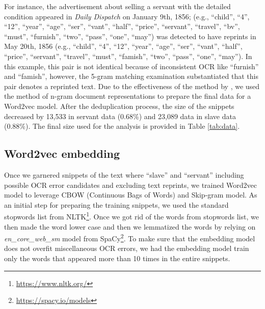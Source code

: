 \documentclass[11pt]{article}
\begin{document}
For instance, the advertisement about selling a servant with the detailed condition appeared in \textit{Daily Dispatch} on January 9th, 1856; 
(e.g., ``child'', ``4'', ``12'', ``year'', ``age'', ``ser'', ``vant'', ``half'', ``price'', ``servant'', ``travel'', ``bv'', ``must'', ``furnish'', ``two'', ``pass'', ``one'', ``may'') 
was detected to have reprints in May 20th, 1856 
(e.g., ``child'', ``4'', ``12'', ``year'', ``age'', ``ser'', ``vant'', ``half'', ``price'', ``servant'', ``travel'', ``must'', ``famish'', ``two'', ``pass'', ``one'', ``may''). 
In this example, this pair is not identical because of inconsistent OCR like ``furnish'' and ``famish'', however, the 5-gram matching examination substantiated that this pair denotes a reprinted text. 
Due to the effectiveness of the method by \citet{smith_detecting_2014}, we used the method of n-gram document representations to prepare the final data for a Word2vec model. 
After the deduplication process, the size of the snippets decreased by 13,533 in servant data (0.68\%) and 23,089 data in slave data (0.88\%). 
The final size used for the analysis is provided in Table \ref{tab:data}.

\subsection{Word2vec embedding} \label{word2vec embedding}
Once we garnered snippets of the text where ``slave'' and ``servant'' including possible OCR error candidates and excluding text reprints, we trained Word2vec model \citep{mikolov_distributed_2013} to leverage CBOW (Continuous Bags of Words) and Skip-gram model.
As an initial step for preparing the training snippets, we used the standard stopwords list from NLTK\footnote{\url{https://www.nltk.org/}}.
Once we got rid of the words from stopwords list, we then made the word lower case and then we lemmatized the words by relying on \textit{en\_core\_web\_sm} model from SpaCy\footnote{\url{https://spacy.io/models}}.
To make sure that the embedding model does not overfit miscellaneous OCR errors, we had the embedding model train only the words that appeared more than 10 times in the entire snippets.
\end{document}
